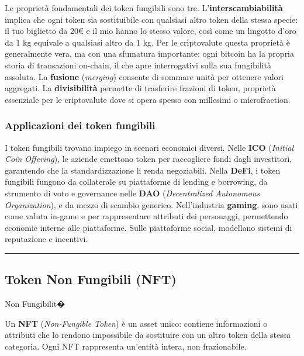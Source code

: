 \documentclass[
  italian,
  openany]{book}
\begin{document}
Le proprietà fondamentali dei token fungibili sono tre.
L'\textbf{interscambiabilità} implica che ogni token sia sostituibile
con qualsiasi altro token della stessa specie: il tuo biglietto da 20€ e
il mio hanno lo stesso valore, così come un lingotto d'oro da 1 kg
equivale a qualsiasi altro da 1 kg. Per le criptovalute questa proprietà
è generalmente vera, ma con una sfumatura importante: ogni bitcoin ha la
propria storia di transazioni on-chain, il che apre interrogativi sulla
sua fungibilità assoluta. La \textbf{fusione} (\emph{merging}) consente
di sommare unità per ottenere valori aggregati. La \textbf{divisibilità}
permette di trasferire frazioni di token, proprietà essenziale per le
criptovalute dove si opera spesso con millesimi o microfraction.

\subsubsection{Applicazioni dei token
fungibili}\label{applicazioni-dei-token-fungibili}

I token fungibili trovano impiego in scenari economici diversi. Nelle
\textbf{ICO} (\emph{Initial Coin Offering}), le aziende emettono token
per raccogliere fondi dagli investitori, garantendo che la
standardizzazione li renda negoziabili. Nella \textbf{DeFi}, i token
fungibili fungono da collaterale su piattaforme di lending e borrowing,
da strumento di voto e governance nelle \textbf{DAO}
(\emph{Decentralized Autonomous Organization}), e da mezzo di scambio
generico. Nell'industria \textbf{gaming}, sono usati come valuta in-game
e per rappresentare attributi dei personaggi, permettendo economie
interne alle piattaforme. Sulle piattaforme social, modellano sistemi di
reputazione e incentivi.

\begin{center}\rule{0.5\linewidth}{0.5pt}\end{center}

\subsection{Token Non Fungibili (NFT)}\label{token-non-fungibili-nft}

\begin{calloutdefinition}{Non Fungibilit�}

Un \textbf{NFT} (\emph{Non-Fungible Token}) è un asset unico: contiene
informazioni o attributi che lo rendono impossibile da sostituire con un
altro token della stessa categoria. Ogni NFT rappresenta un'entità
intera, non frazionabile.

\end{calloutdefinition}
\end{document}
